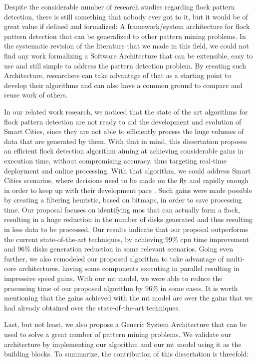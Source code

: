 Despite the considerable number of research studies regarding flock pattern detection, there is still something that
nobody ever got to it, but it would be of great value if defined and formalized: A framework/system architecture for
flock pattern detection that can be generalized to other pattern mining problems. In the systematic revision of the
literature that we made in this field, we could not find any work formalizing a Software Architecture that can be
extensible, easy to use and still simple to address the pattern detection problem. By creating such Architecture,
researchers can take advantage of that as a starting point to develop their algorithms and can also have a common ground
to compare and reuse work of others.

In our related work research, we noticed that the state of the art algorithms for flock pattern detection are not ready
to aid the development and evolution of Smart Cities, since they are not able to efficiently process the huge volumes of
data that are generated by them. With that in mind, this dissertation proposes an efficient flock detection algorithm
aiming at achieving considerable gains in execution time, without compromising accuracy, thus targeting real-time
deployment and online processing. With that algorithm, we could address Smart Cities scenarios, where decisions need to
be made on the fly and rapidly enough in order to keep up with their development pace
\citep{ieeesmartcities}\citep{springersmartcities}. Such gains were made possible by creating a filtering heuristic,
based on bitmaps, in order to save processing time. Our proposal focuses on identifying \acp{mo} that can actually form
a flock, resulting in a huge reduction in the number of disks generated and thus resulting in less data to be processed.
Our results indicate that our proposal outperforms the current state-of-the-art techniques, by achieving 99\% \ac{cpu}
time improvement and 96\% disks generation reduction in some relevant scenarios. Going even further, we also remodeled
our proposed algorithm to take advantage of multi-core architectures, having some components executing in parallel
resulting in impressive speed gains. With our \ac{mt} model, we were able to reduce the processing time of our proposed
algorithm by 96\% in some cases. It is worth mentioning that the gains achieved with the \ac{mt} model are over the
gains that we had already obtained over the state-of-the-art techniques.

Last, but not least, we also propose a Generic System Architecture that can be used to solve a great number of pattern
mining problems. We validate our architecture by implementing our algorithm and our \ac{mt} model using it as the
building blocks. To summarize, the contribution of this dissertation is threefold:

